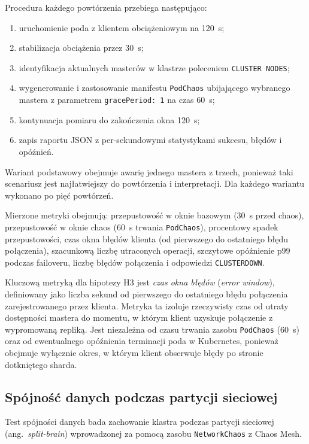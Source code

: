 Procedura każdego powtórzenia przebiega następująco:

\begin{enumerate}
    \item uruchomienie poda z klientem obciążeniowym na 120~s;
    \item stabilizacja obciążenia przez 30~s;
    \item identyfikacja aktualnych masterów w klastrze poleceniem \texttt{CLUSTER NODES};
    \item wygenerowanie i zastosowanie manifestu \texttt{PodChaos} ubijającego wybranego mastera z parametrem \texttt{gracePeriod: 1} na czas 60~s;
    \item kontynuacja pomiaru do zakończenia okna 120~s;
    \item zapis raportu JSON z per-sekundowymi statystykami sukcesu, błędów i opóźnień.
\end{enumerate}

Wariant podstawowy obejmuje awarię jednego mastera z trzech, ponieważ taki scenariusz jest najłatwiejszy do powtórzenia i interpretacji. Dla każdego wariantu wykonano po pięć powtórzeń.

Mierzone metryki obejmują: przepustowość w oknie bazowym (30~s przed chaos), przepustowość w oknie chaos (60~s trwania \texttt{PodChaos}), procentowy spadek przepustowości, czas okna błędów klienta (od pierwszego do ostatniego błędu połączenia), szacunkową liczbę utraconych operacji, szczytowe opóźnienie p99 podczas failoveru, liczbę błędów połączenia i odpowiedzi \texttt{CLUSTERDOWN}.

Kluczową metryką dla hipotezy H3 jest \textit{czas okna błędów} (\textit{error window}), definiowany jako liczba sekund od pierwszego do ostatniego błędu połączenia zarejestrowanego przez klienta. Metryka ta izoluje rzeczywisty czas od utraty dostępności mastera do momentu, w którym klient uzyskuje połączenie z wypromowaną repliką. Jest niezależna od czasu trwania zasobu \texttt{PodChaos} (60~s) oraz od ewentualnego opóźnienia terminacji poda w Kubernetes, ponieważ obejmuje wyłącznie okres, w którym klient obserwuje błędy po stronie dotkniętego sharda.

\subsection{Spójność danych podczas partycji sieciowej}\label{subsec:split_brain}

Test spójności danych bada zachowanie klastra podczas partycji sieciowej (ang.~\textit{split-brain}) wprowadzonej za pomocą zasobu \texttt{NetworkChaos} z Chaos Mesh.

